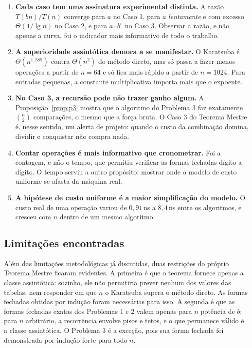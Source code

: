 \documentclass[11pt,a4paper]{article}
\begin{document}
\begin{enumerate}[itemsep=3pt]
  \item \textbf{Cada caso tem uma assinatura experimental distinta.} A razão $T(bn)/T(n)$ converge para $a$ no Caso 1, para $a$ \emph{lentamente} e com excesso $\Theta(1/\lg n)$ no Caso 2, e para $a\cdot b^\varepsilon$ no Caso 3. Observar a razão, e não apenas a curva, foi o indicador mais informativo de todo o trabalho.
  \item \textbf{A superioridade assintótica demora a se manifestar.} O Karatsuba é $\Theta(n^{1{,}585})$ contra $\Theta(n^2)$ do método direto, mas só passa a fazer menos operações a partir de $n=64$ e só fica mais rápido a partir de $n=1024$. Para entradas pequenas, a constante multiplicativa importa mais que o expoente.
  \item \textbf{No Caso 3, a recursão pode não trazer ganho algum.} A Proposição~\ref{prop:p3} mostra que o algoritmo do Problema 3 faz exatamente $\binom n2$ comparações, o mesmo que a força bruta. O Caso 3 do Teorema Mestre é, nesse sentido, um alerta de projeto: quando o custo da combinação domina, dividir e conquistar não compra nada.
  \item \textbf{Contar operações é mais informativo que cronometrar.} Foi a contagem, e não o tempo, que permitiu verificar as formas fechadas dígito a dígito. O tempo serviu a outro propósito: mostrar onde o modelo de custo uniforme se afasta da máquina real.
  \item \textbf{A hipótese de custo uniforme é a maior simplificação do modelo.} O custo real de uma operação variou de $0{,}91$\,ns a $8{,}4$\,ns entre os algoritmos, e cresceu com $n$ dentro de um mesmo algoritmo.
\end{enumerate}

\subsection{Limitações encontradas}

Além das limitações metodológicas já discutidas, duas restrições do próprio Teorema Mestre ficaram evidentes. A primeira é que o teorema fornece apenas a classe assintótica: sozinho, ele não permitiria prever nenhum dos valores das tabelas, nem responder em que $n$ o Karatsuba supera o método direto. As formas fechadas obtidas por indução foram necessárias para isso. A segunda é que as formas fechadas exatas dos Problemas 1 e 2 valem apenas para $n$ potência de $b$; para $n$ arbitrário, a recorrência envolve pisos e tetos, e o que permanece válido é a classe assintótica. O Problema 3 é a exceção, pois sua forma fechada foi demonstrada por indução forte para todo $n$.
\end{document}
